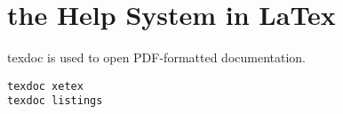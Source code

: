 \section{the Help System in LaTex}
texdoc is used to open PDF-formatted documentation.
\begin{verbatim}
texdoc xetex
texdoc listings
\end{verbatim}






